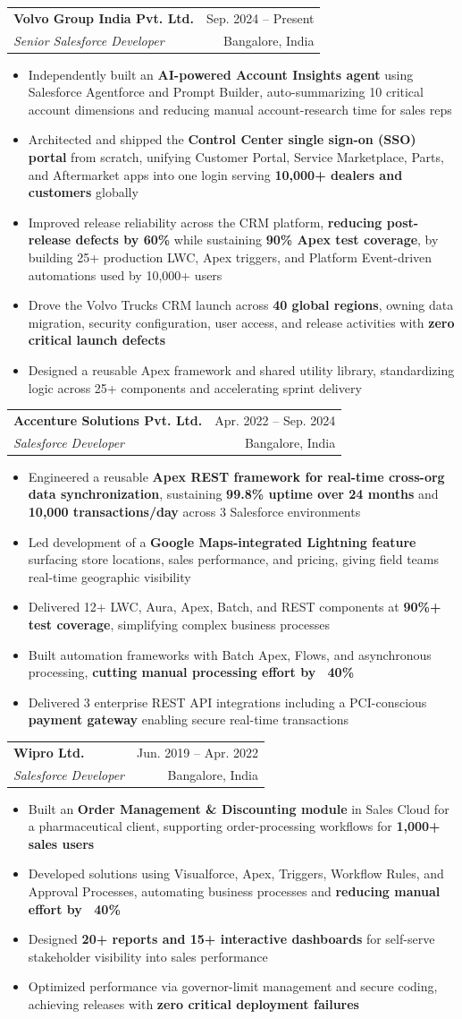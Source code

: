 \documentclass[letterpaper,11pt]{article}
\makeatletter
\newcommand{\resumeItem}[1]{
  \item\small{
    {#1 \vspace{-1pt}}
  }
}
\newcommand{\resumeSubheading}[4]{
  \vspace{-1pt}\item
    \begin{tabular*}{\textwidth}[t]{l@{\extracolsep{\fill}}r}
      \textbf{#1} & {\color{dark-grey}\small #2}\vspace{1pt}\\
      \textit{#3} & {\color{dark-grey} \small #4}\\
    \end{tabular*}\vspace{-4pt}
}
\newcommand{\resumeItemListStart}{\begin{itemize}}
\newcommand{\resumeItemListEnd}{\end{itemize}\vspace{0pt}}
\makeatother
\begin{document}
    \resumeSubheading
      {Volvo Group India Pvt. Ltd.}{Sep. 2024 -- Present}
      {Senior Salesforce Developer}{Bangalore, India}
      \resumeItemListStart
        \resumeItem{Independently built an \textbf{AI-powered Account Insights agent} using Salesforce Agentforce and Prompt Builder, auto-summarizing 10 critical account dimensions and reducing manual account-research time for sales reps}
        \resumeItem{Architected and shipped the \textbf{Control Center single sign-on (SSO) portal} from scratch, unifying Customer Portal, Service Marketplace, Parts, and Aftermarket apps into one login serving \textbf{10,000+ dealers and customers} globally}
        \resumeItem{Improved release reliability across the CRM platform, \textbf{reducing post-release defects by 60\%} while sustaining \textbf{90\% Apex test coverage}, by building 25+ production LWC, Apex triggers, and Platform Event-driven automations used by 10,000+ users}
        \resumeItem{Drove the Volvo Trucks CRM launch across \textbf{40 global regions}, owning data migration, security configuration, user access, and release activities with \textbf{zero critical launch defects}}
        \resumeItem{Designed a reusable Apex framework and shared utility library, standardizing logic across 25+ components and accelerating sprint delivery}
      \resumeItemListEnd

    \resumeSubheading
      {Accenture Solutions Pvt. Ltd.}{Apr. 2022 -- Sep. 2024}
      {Salesforce Developer}{Bangalore, India}
      \resumeItemListStart
        \resumeItem{Engineered a reusable \textbf{Apex REST framework for real-time cross-org data synchronization}, sustaining \textbf{99.8\% uptime over 24 months} and \textbf{10,000 transactions/day} across 3 Salesforce environments}
        \resumeItem{Led development of a \textbf{Google Maps-integrated Lightning feature} surfacing store locations, sales performance, and pricing, giving field teams real-time geographic visibility}
        \resumeItem{Delivered 12+ LWC, Aura, Apex, Batch, and REST components at \textbf{90\%+ test coverage}, simplifying complex business processes}
        \resumeItem{Built automation frameworks with Batch Apex, Flows, and asynchronous processing, \textbf{cutting manual processing effort by ~40\%}}
        \resumeItem{Delivered 3 enterprise REST API integrations including a PCI-conscious \textbf{payment gateway} enabling secure real-time transactions}
      \resumeItemListEnd

    \resumeSubheading
      {Wipro Ltd.}{Jun. 2019 -- Apr. 2022}
      {Salesforce Developer}{Bangalore, India}
      \resumeItemListStart
        \resumeItem{Built an \textbf{Order Management \& Discounting module} in Sales Cloud for a pharmaceutical client, supporting order-processing workflows for \textbf{1,000+ sales users}}
        \resumeItem{Developed solutions using Visualforce, Apex, Triggers, Workflow Rules, and Approval Processes, automating business processes and \textbf{reducing manual effort by ~40\%}}
        \resumeItem{Designed \textbf{20+ reports and 15+ interactive dashboards} for self-serve stakeholder visibility into sales performance}
        \resumeItem{Optimized performance via governor-limit management and secure coding, achieving releases with \textbf{zero critical deployment failures}}
      \resumeItemListEnd
\end{document}

